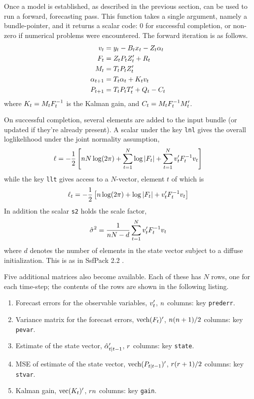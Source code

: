 Once a model is established, as described in the previous section,
 can be used to run a forward, forecasting pass.  This
function takes a single argument, namely a bundle-pointer, and it
returns a scalar code: 0 for successful completion, or non-zero if
numerical problems were encountered. The forward iteration is as
follows.
%
\begin{align*}
  v_t &= y_t - B_tx_t - Z_t \alpha_t \\
  F_t &= Z_t P_t Z_t' + R_t \\
  M_t &= T_t P_t Z_t'\\
  \alpha_{t+1} &= T_t \alpha_t + K_t v_t \\
  P_{t+1} &= T_t P_t T_t' + Q_t - C_t\\
\end{align*}
%
where $K_t = M_tF^{-1}_t$ is the Kalman gain, and
$C_t = M_tF^{-1}_tM'_t$.

On successful completion, several elements are added to the input
bundle (or updated if they're already present).  A scalar under the
key \texttt{lnl} gives the overall loglikelihood under the joint
normality assumption,
%
\[
  \ell = -\frac{1}{2} \left[n N \log(2 \pi) + \sum_{t=1}^N\log \left|F_t\right| +
    \sum_{t=1}^Nv_t'F_t^{-1} v_t
  \right]
\]
%
while the key \texttt{llt} gives access to a $N$-vector, element $t$ of
which is
%
\[
  \ell_t = -\frac{1}{2} \left[n \log(2 \pi) + \log \left|F_t\right| +
    v_t'F_t^{-1} v_t
  \right]
\]
In addition the scalar \texttt{s2} holds the scale factor,
%
\[
\hat{\sigma}^2 = \frac{1}{n N-d}
   \sum_{t=1}^Nv_t'F_t^{-1} v_t
 \]
where $d$ denotes the number of elements in the state vector subject
to a diffuse initialization. This is as in \textsf{SsfPack 2.2}
\citep{koopman-etal99}.

Five additional matrices also become available.  Each of these has $N$
rows, one for each time-step; the contents of the rows are shown in
the following listing.
%
\begin{enumerate}
\item Forecast errors for the observable variables, $v_t'$,
  $n$ columns: key \texttt{prederr}.
\item Variance matrix for the forecast errors, $\mbox{vech}(F_t)'$,
  $n(n + 1)/2$ columns: key \texttt{pevar}.
\item Estimate of the state vector, $\hat{\alpha}_{t|t-1}'$,
  $r$ columns: key \texttt{state}.
\item MSE of estimate of the state vector,
  $\mbox{vech}(P_{t|t-1})'$, $r(r + 1)/2$ columns: key
  \texttt{stvar}.
\item Kalman gain, $\mbox{vec}(K_t)'$, $r n$ columns: key
  \texttt{gain}.
\end{enumerate}

